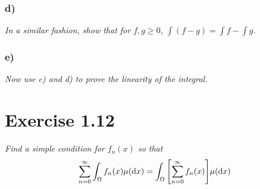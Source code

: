 \documentclass[12pt]{article}
\theoremstyle{plain}
\begin{document}
\subsubsection*{ d)}
\textit{In a similar fashion, show that for $f, g \geq 0$, $\int(f - g) = \int f - \int g$.}

\subsubsection*{ e)}
\textit{Now use c) and d) to prove the linearity of the integral.}

\section*{Exercise 1.12}
\textit{Find a simple condition for $f_n(x)$ so that}
\begin{align*}
    \sum_{n=0}^\infty \int_\Omega f_n(x) \mu(\dd x) = \int_\Omega \qty[\sum_{n=0}^\infty f_n(x)]\mu(\dd x)
\end{align*}
\end{document}
